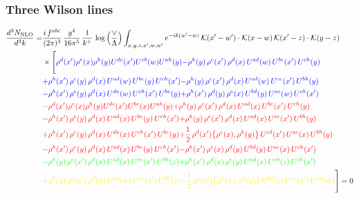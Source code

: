 \documentclass[9pt]{article}
\numberwithin{equation}{section}
\begin{document}
\subsubsection{Three Wilson lines}
\begin{align}
    \frac{d^{3}N_{\rm NLO}}{d^{3}k}= & \frac{i\,f^{abc}}{(2\pi)^{3}}\,\frac{g^{4}}{16\pi^{5}}\,\frac{1}{k^{+}}\,\log\Big(\frac{\vee}{\Lambda}\Big)\int_{x,y,z,x',w,w'}e^{-ik(w'-w)}\,\mathcal{K}(x'-w')\cdot\mathcal{K}(x-w)\,\mathcal{K}(x'-z)\cdot\mathcal{K}(y-z)\notag \\ & \times\Bigg[{\color{blue}\rho^{d}(x') \rho^{e}(x) \rho^{h}(y) U^{d c}(x') U^{e b}(w) U^{a h}(y)}{\color{blue}-\rho^{h}(y)\,\rho^{e}(x')\,\rho^{d}(x)\,U^{ad}(w)\,U^{be}(x')\,U^{ch}(y)}\notag \\
&{\color{blue}+\rho^{h}(x')\,\rho^{e}(y)\,\rho^{d}(x)\,U^{ad}(w)\,U^{be}(y)\,U^{ch}(x')}{\color{blue}-\rho^{h}(y)\,\rho^{e}(x')\,\rho^{d}(x)\,U^{ad}(w)\,U^{ce}(x')\,U^{bh}(y)} \notag \\ &{\color{blue}-\rho^{h}(x')\,\rho^{e}(y)\,\rho^{d}(x)\,U^{da}(w)\,U^{ch}(x')\,U^{be}(y)}{\color{blue}+\rho^{h}(x')\,\rho^{d}(y)\,\rho^{e}(x)\,U^{bd}(y)\,U^{ae}(w)\,U^{ch}(x')}\notag \\
&{\color{red}-\rho^{d}(x') \rho^{e}(x) \rho^{h}(y) U^{d c}(x') U^{b e}(x) U^{a h}(y)}{\color{red}+\rho^{h}(y)\,\rho^{e}(x')\,\rho^{d}(x)\,U^{ad}(x)\,U^{be}(x')\,U^{ch}(y)}\notag \\ & {\color{red}-\rho^{h}(x')\,\rho^{e}(y)\,\rho^{d}(x)\,U^{ad}(x)\,U^{be}(y)\,U^{ch}(x')} {\color{red}+\rho^{h}(y)\,\rho^{e}(x')\,\rho^{d}(x)\,U^{ad}(x)\,U^{ce}(x')\,U^{bh}(y)}\notag \\ & {\color{red}+\rho^{h}(x')\,\rho^{e}(y)\,\rho^{d}(x)\,U^{da}(x)\,U^{ch}(x')\,U^{be}(y)}{\color{red}+\frac{1}{2}\,\rho^{d}(x')\big\{\rho^{e}(x),\rho^{h}(y)\big\}\,U^{cd}(x')\,U^{ae}(x)\,U^{bh}(y)}\notag \\ & {\color{red}-\rho^{h}(x')\,\rho^{e}(y)\,\rho^{d}(x)\,U^{ad}(x)\,U^{be}(y)\,U^{ch}(x')}{\color{red}-\rho^{h}(x')\,\rho^{e}(x)\,\rho^{d}(y)\,U^{bd}(y)\,U^{ae}(x)\,U^{ch}(x')}\notag \\ & {\color{green}-\rho^{h}(y)\,\rho^{e}(x')\,\rho^{d}(x)\,U^{ad}(x)\,U^{ce}(x')\,U^{bh}(z)}{\color{green}+\rho^{h}(x')\,\rho^{d}(x)\,\rho^{e}(y)\,U^{ad}(x)\,U^{eb}(z)\,U^{ch}(x')}\notag \\ & {\color{yellow}+\rho^{h}(y)\,\rho^{e}(x')\,\rho^{d}(x)\,U^{ad}(w)\,U^{ce}(x')\,U^{bh}(z)}{\color{yellow}-\frac{1}{2}\,\rho^{e}(x')\big\{\rho^{h}(x),\rho^{d}(y)\big\}\,U^{bd}(z)\,U^{ce}(x')\,U^{ah}(w)}\Bigg] = 0
\end{align}
\end{document}
